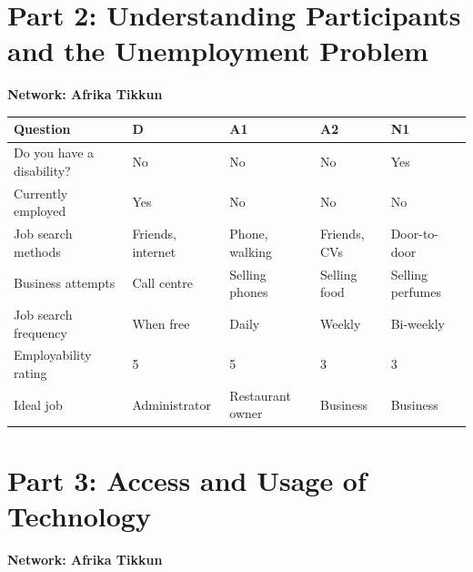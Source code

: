 
\section{Part 2: Understanding Participants and the Unemployment Problem}

\textbf{Network: Afrika Tikkun}

\begin{tabularx}{\textwidth}{|p{3.8cm}|X|X|X|X|}
\hline
\rowcolor{gray!30}
\textbf{Question} & \textbf{D} & \textbf{A1} & \textbf{A2} & \textbf{N1} \\
\hline

Do you have a disability? & No & No & No & Yes \\
\hline

Currently employed & Yes & No & No & No \\
\hline

Job search methods & Friends, internet & Phone, walking & Friends, CVs & Door-to-door \\
\hline

Business attempts & Call centre & Selling phones & Selling food & Selling perfumes \\
\hline

Job search frequency & When free & Daily & Weekly & Bi-weekly \\
\hline

Employability rating & 5 & 5 & 3 & 3 \\
\hline

Ideal job & Administrator & Restaurant owner & Business & Business \\
\hline

\end{tabularx}


\section{Part 3: Access and Usage of Technology}

\textbf{Network: Afrika Tikkun}

